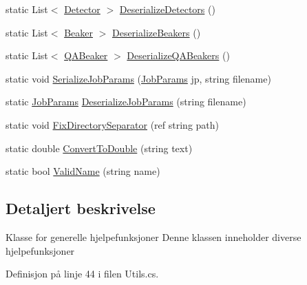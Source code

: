 \begin{DoxyCompactItemize}
\item 
static List$<$ \hyperlink{class_scintilab_1_1_detector}{Detector} $>$ \hyperlink{class_scintilab_1_1_utils_a5012b935966d80094fb6dd5f6c02df53}{Deserialize\+Detectors} ()
\item 
static List$<$ \hyperlink{class_scintilab_1_1_beaker}{Beaker} $>$ \hyperlink{class_scintilab_1_1_utils_af01c79a4a4da7f3dcffc8e22fc06ecd1}{Deserialize\+Beakers} ()
\item 
static List$<$ \hyperlink{class_scintilab_1_1_q_a_beaker}{Q\+A\+Beaker} $>$ \hyperlink{class_scintilab_1_1_utils_a8a2f63ffeeda51eef2fc7a396f672cd9}{Deserialize\+Q\+A\+Beakers} ()
\item 
static void \hyperlink{class_scintilab_1_1_utils_adca861b1ad9c5024c6c1a7d2973011a5}{Serialize\+Job\+Params} (\hyperlink{class_scintilab_1_1_job_params}{Job\+Params} jp, string filename)
\item 
static \hyperlink{class_scintilab_1_1_job_params}{Job\+Params} \hyperlink{class_scintilab_1_1_utils_a2a6b21245e3a5aaeb201f2f665d77963}{Deserialize\+Job\+Params} (string filename)
\item 
static void \hyperlink{class_scintilab_1_1_utils_a1cbfcf1a651ebba2fd8fcf77b1c325f9}{Fix\+Directory\+Separator} (ref string path)
\item 
static double \hyperlink{class_scintilab_1_1_utils_ad7f3df742cd873fc5fd874c4b87b1b5f}{Convert\+To\+Double} (string text)
\item 
static bool \hyperlink{class_scintilab_1_1_utils_ad3f536338f6bca04d545e74499d7b2e5}{Valid\+Name} (string name)
\end{DoxyCompactItemize}


\subsection{Detaljert beskrivelse}
Klasse for generelle hjelpefunksjoner Denne klassen inneholder diverse hjelpefunksjoner 

Definisjon på linje 44 i filen Utils.\+cs.



